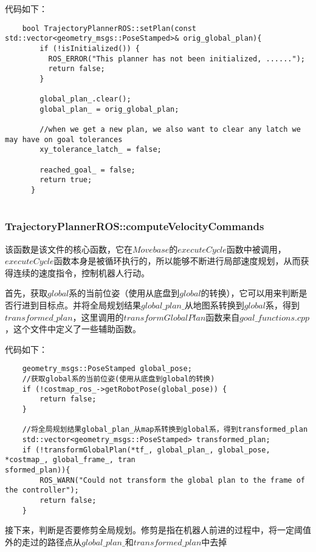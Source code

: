 \documentclass[9pt, oneside]{book}
\begin{document}
代码如下：

\footnotesize
\begin{verbatim}
    bool TrajectoryPlannerROS::setPlan(const std::vector<geometry_msgs::PoseStamped>& orig_global_plan){
        if (!isInitialized()) {
          ROS_ERROR("This planner has not been initialized, ......");
          return false;
        }
    
        global_plan_.clear();
        global_plan_ = orig_global_plan;
        
        //when we get a new plan, we also want to clear any latch we may have on goal tolerances
        xy_tolerance_latch_ = false;
    
        reached_goal_ = false;
        return true;
      }
    
\end{verbatim}
\normalsize

\subsubsection{TrajectoryPlannerROS::computeVelocityCommands}

该函数是该文件的核心函数，它在$Movebase$的$executeCycle$函数中被调用，$executeCycle$函数本身是被循环执行的，所以能够不断进行局部速度规划，从而获得连续的速度指令，控制机器人行动。

首先，获取$global$系的当前位姿（使用从底盘到$global$的转换），它可以用来判断是否行进到目标点。并将全局规划结果$global\_plan\_$从地图系转换到$global$系，得到$transformed\_plan$，这里调用的$transformGlobalPlan$函数来自$goal\_functions.cpp$，这个文件中定义了一些辅助函数。

代码如下：

\small
\begin{verbatim}
    geometry_msgs::PoseStamped global_pose;
    //获取global系的当前位姿(使用从底盘到global的转换)
    if (!costmap_ros_->getRobotPose(global_pose)) {
        return false;
    }

    //将全局规划结果global_plan_从map系转换到global系，得到transformed_plan
    std::vector<geometry_msgs::PoseStamped> transformed_plan;
    if (!transformGlobalPlan(*tf_, global_plan_, global_pose, *costmap_, global_frame_, tran
sformed_plan)){
        ROS_WARN("Could not transform the global plan to the frame of the controller");
        return false;
    }
\end{verbatim}
\normalsize

接下来，判断是否要修剪全局规划。修剪是指在机器人前进的过程中，将一定阈值外的走过的路径点从$global\_plan\_$和$transformed\_plan$中去掉
\end{document}
